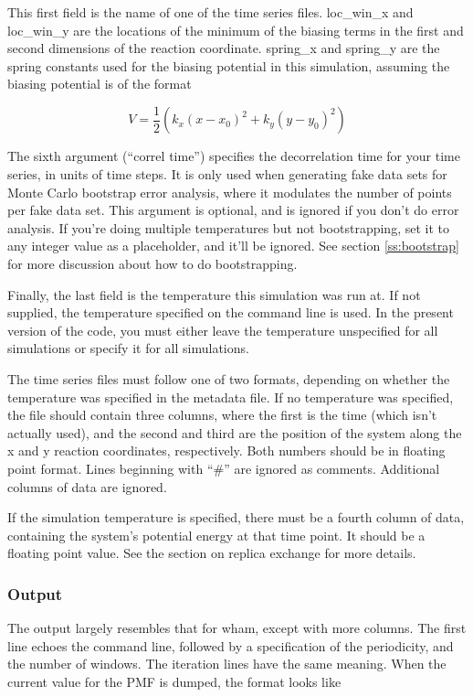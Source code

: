 \documentclass[12pt]{article}
\begin{document}
This first field is the name of one of the time series files.  loc\_win\_x
and loc\_win\_y are the locations of the minimum of the biasing terms in the
first and second dimensions of the reaction coordinate.  spring\_x and
spring\_y are the spring constants used for the biasing potential in this
simulation, assuming the biasing potential is of the format

\begin{equation}
V = \frac{1}{2} ( k_x (x - x_0)^2 + k_y (y -y_0)^2 )
\end{equation}

The sixth argument (``correl time'') specifies the decorrelation time for
your time series, in units of time steps.  It is only used when generating
fake data sets for Monte Carlo bootstrap error analysis, where it modulates
the number of points per fake data set.  This argument is optional, and is
ignored if you don't do error analysis.  If you're doing multiple
temperatures but not bootstrapping, set it to any integer value as a
placeholder, and it'll be ignored.  See section \ref{ss:bootstrap} for more
discussion about how to do bootstrapping.

Finally, the last field is the temperature this simulation was run at.  If
not supplied, the temperature specified on the command line is used.  In
the present version of the code, you must either leave the temperature
unspecified for all simulations or specify it for all simulations.  

The time series files must follow one of two formats, depending on whether
the temperature was specified in the metadata file.  If no temperature was
specified, the file should contain three columns, where the first is the
time (which isn't actually used), and the second and third are the position
of the system along the x and y reaction coordinates, respectively.  Both
numbers should be in floating point format.  Lines beginning with ``\#'' are
ignored as comments.  Additional columns of data are ignored.

If the simulation temperature is specified, there must be a fourth column of
data, containing the system's potential energy at that time point.  It
should be a floating point value.  See the section on replica exchange for
more details.

\subsubsection{Output}

The output largely resembles that for wham, except with more columns.  The
first line echoes the command line, followed by a specification of the
periodicity, and the number of windows.  The iteration lines have the same
meaning.  When the current value for the PMF is dumped, the format looks
like 
\end{document}
